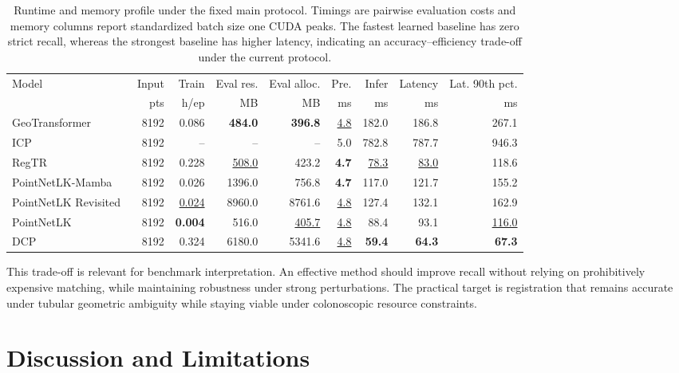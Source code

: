 \documentclass{bmvc2k}
\newcommand{\best}[1]{\textbf{#1}}
\newcommand{\second}[1]{\underline{#1}}
\begin{document}
\begin{table}[!htbp]
\centering
\caption{Runtime and memory profile under the fixed main protocol. Timings are pairwise evaluation costs and memory columns report standardized batch size one CUDA peaks. The fastest learned baseline has zero strict recall, whereas the strongest baseline has higher latency, indicating an accuracy--efficiency trade-off under the current protocol.}
\label{tab:efficiency}
\scriptsize
\setlength{\tabcolsep}{3.5pt}
\begin{tabular}{lrrrrrrrr}
\hline
Model & Input & Train & Eval res. & Eval alloc. & Pre. & Infer & Latency & Lat. 90th pct. \\
 & pts & h/ep & MB & MB & ms & ms & ms & ms \\
\hline
GeoTransformer~\cite{qin2022geometric} & 8192 & 0.086 & \best{484.0} & \best{396.8} & \second{4.8} & 182.0 & 186.8 & 267.1 \\
ICP~\cite{besl1992method} & 8192 & -- & -- & -- & 5.0 & 782.8 & 787.7 & 946.3 \\
RegTR~\cite{yew2022regtr} & 8192 & 0.228 & \second{508.0} & 423.2 & \best{4.7} & \second{78.3} & \second{83.0} & 118.6 \\
PointNetLK-Mamba & 8192 & 0.026 & 1396.0 & 756.8 & \best{4.7} & 117.0 & 121.7 & 155.2 \\
PointNetLK Revisited~\cite{li2021pointnetlk} & 8192 & \second{0.024} & 8960.0 & 8761.6 & \second{4.8} & 127.4 & 132.1 & 162.9 \\
PointNetLK~\cite{aoki2019pointnetlk} & 8192 & \best{0.004} & 516.0 & \second{405.7} & \second{4.8} & 88.4 & 93.1 & \second{116.0} \\
DCP~\cite{wang2019deep} & 8192 & 0.324 & 6180.0 & 5341.6 & \second{4.8} & \best{59.4} & \best{64.3} & \best{67.3} \\
\hline
\end{tabular}
\end{table}

This trade-off is relevant for benchmark interpretation. An effective method should improve recall without relying on prohibitively expensive matching, while maintaining robustness under strong perturbations. The practical target is registration that remains accurate under tubular geometric ambiguity while staying viable under colonoscopic resource constraints.

\section{Discussion and Limitations}
\label{sec:discussion}
\end{document}
